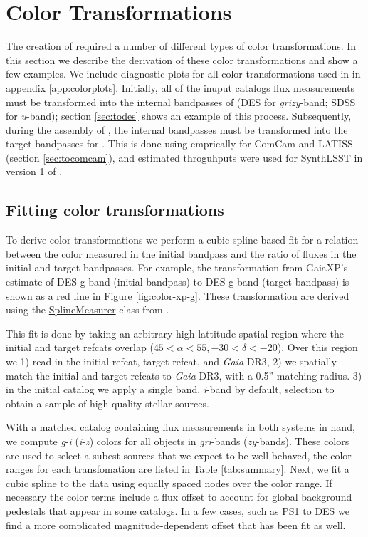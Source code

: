 \section{Color Transformations}
\label{sec:colors}
The creation of \monster required a number of different types of color transformations. 
In this section we describe the derivation of these color transformations and show a few examples. 
We include diagnostic plots for all color transformations used in \monster in appendix \ref{app:colorplots}. 
Initially, all of the inuput catalogs flux measurements must be transformed into the internal bandpasses of \monster (DES for \emph{grizy}-band; SDSS for \emph{u}-band); section \ref{sec:todes} shows an example of this process. 
Subsequently, during the assembly of \monster, the internal bandpasses must be transformed into the target bandpasses for \monster. 
This is done using emprically for ComCam and LATISS (section \ref{sec:tocomcam}), and estimated throguhputs were used for SynthLSST in version 1 of \monster. 


\subsection{Fitting color transformations}
To derive color transformations we perform a cubic-spline based fit for a relation between the color measured in the initial bandpass and the ratio of fluxes in the initial and target bandpasses.
For example, the transformation from GaiaXP's estimate of DES g-band (initial bandpass) to DES g-band (target bandpass) is shown as a red line in Figure \ref{fig:color-xp-g}. 
These transformation are derived using the \href{https://github.com/lsst-dm/the_monster/blob/main/python/lsst/the/monster/measure_colorterms.py}{SplineMeasurer} class from \monster. 

This fit is done by taking an arbitrary high lattitude spatial region where the initial and target refcats overlap ($45 < \alpha <  55, -30 < \delta < -20 $). 
Over this region we 1) read in the initial refcat, target refcat, and \emph{Gaia}-DR3, 2) we spatially match the initial and target refcats to \emph{Gaia}-DR3, with a 0.5'' matching radius. 3) in the initial catalog we apply a single band, \textit{i}-band by default, selection to obtain a sample of high-quality stellar-sources.  

With a matched catalog containing flux measurements in both systems in hand, we compute \emph{g}-\emph{i} (\emph{i}-\emph{z}) colors for all objects in \emph{gri}-bands (\emph{zy}-bands). 
These colors are used to select a subest sources that we expect to be well behaved, the color ranges for each transfomation are listed in Table \ref{tab:summary}.
Next, we fit a cubic spline to the data using equally spaced nodes over the color range.
If necessary the color terms include a flux offset to account for global background pedestals that appear in some catalogs. 
In a few cases, such as PS1 to DES we find a more complicated magnitude-dependent offset that has been fit as well.

